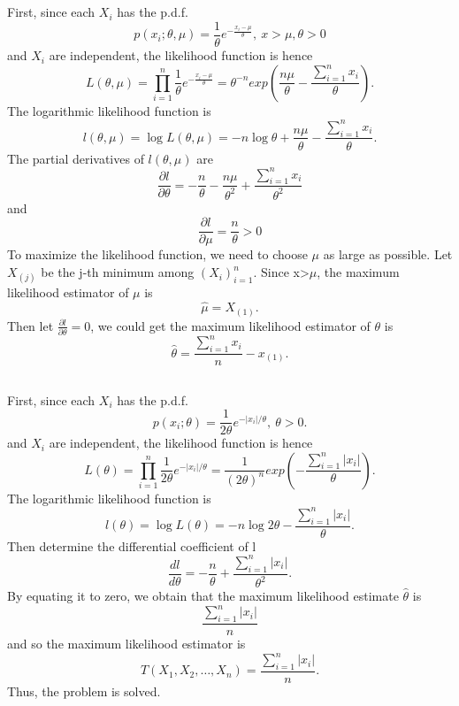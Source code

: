 \documentclass[10.5pt]{article}
\begin{document}
\subsection{}
First, since each $X_i$ has the p.d.f. $$p(x_i;\theta,\mu)=\frac{1}{\theta}e^{-\frac{x_i-\mu} {\theta}},~x>\mu,\theta>0$$\indent
and $X_i$ are independent, the likelihood function is hence $$L(\theta,\mu)=\prod_{i=1}^n\frac{1}{\theta}e^{-\frac{x_i-\mu}{\theta}}=\theta^{-n}exp(\frac{n\mu}{\theta}-\frac{\sum_{i=1}^nx_i}{\theta}).$$\indent
The logarithmic likelihood function is $$l(\theta,\mu)=\log L(\theta,\mu)=-n\log\theta+\frac{n\mu}{\theta}-\frac{\sum_{i=1}^nx_i}{\theta}.$$\indent
The partial derivatives of $l(\theta,\mu)$ are $$\frac{\partial l}{\partial\theta}=-\frac{n}{\theta}-\frac{n\mu}{\theta^2}+\frac{\sum_{i=1}^nx_i}{\theta^2}$$\indent
and $$\frac{\partial l}{\partial \mu}=\frac{n}{\theta}>0$$\indent
To maximize the likelihood function, we need to choose $\mu$ as large as possible. Let $X_{(j)}$ be the j-th minimum among $(X_i)_{i=1}^n$. Since x>$\mu$, the maximum likelihood estimator of $\mu$ is $$\hat{\mu}=X_{(1)}.$$\indent
Then let $\frac{\partial l}{\partial \theta}=0$, we could get the maximum likelihood estimator of $\theta$ is $$\hat{\theta}=\frac{\sum_{i=1}^nx_i}{n}-x_{(1)}.$$

\subsection{}
First, since each $X_i$ has the p.d.f. $$p(x_i;\theta)=\frac{1}{2\theta}e^{-\left\rvert x_i\right\rvert/\theta},~\theta>0.$$\indent
and $X_i$ are independent, the likelihood function is hence $$L(\theta)=\prod_{i=1}^n\frac{1}{2\theta}e^{-\left\rvert x_i\right\rvert/\theta}=\frac{1}{(2\theta)^n}exp(-\frac{\sum_{i=1}^n\left\rvert x_i\right\rvert}{\theta}).$$\indent
The logarithmic likelihood function is $$l(\theta)=\log L(\theta)=-n\log 2\theta-\frac{\sum_{i=1}^n\left\rvert x_i\right\rvert}{\theta}.$$\indent
Then determine the differential coefficient of l $$\frac{d l}{d\theta}=-\frac{n}{\theta}+\frac{\sum_{i=1}^n\left\rvert x_i\right\rvert}{\theta^2}.$$\indent
By equating it to zero, we obtain that the maximum likelihood estimate $\hat{\theta}$ is $$\frac{\sum_{i=1}^n\left\rvert x_i\right\rvert}{n}$$\indent
and so the maximum likelihood estimator is $$T(X_1,X_2,\dots,X_n)=\frac{\sum_{i=1}^n\left\rvert x_i\right\rvert}{n}.$$\indent
Thus, the problem is solved.
\end{document}
